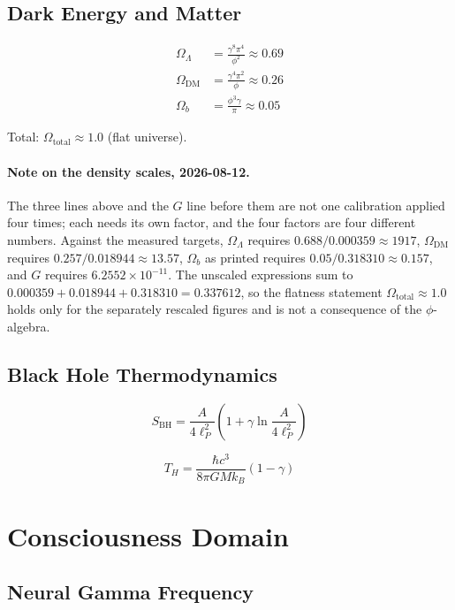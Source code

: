 \documentclass[12pt,a4paper]{article}
\begin{document}
\subsection{Dark Energy and Matter}

\begin{align}
\Omega_\Lambda &= \frac{\gamma^8 \pi^4}{\phi^2} \approx 0.69 \\
\Omega_{\text{DM}} &= \frac{\gamma^4 \pi^2}{\phi} \approx 0.26 \\
\Omega_b &= \frac{\phi^3 \gamma}{\pi} \approx 0.05
\end{align}

Total: $\Omega_{\text{total}} \approx 1.0$ (flat universe).

\paragraph{Note on the density scales, 2026-08-12.} The three lines above and the $G$ line before them are not one calibration applied four times; each needs its own factor, and the four factors are four different numbers. Against the measured targets, $\Omega_\Lambda$ requires $0.688/0.000359 \approx 1917$, $\Omega_{\mathrm{DM}}$ requires $0.257/0.018944 \approx 13.57$, $\Omega_b$ as printed requires $0.05/0.318310 \approx 0.157$, and $G$ requires $6.2552\times10^{-11}$. The unscaled expressions sum to $0.000359 + 0.018944 + 0.318310 = 0.337612$, so the flatness statement $\Omega_{\text{total}} \approx 1.0$ holds only for the separately rescaled figures and is not a consequence of the $\phi$-algebra.

\subsection{Black Hole Thermodynamics}

\begin{equation}
S_{\text{BH}} = \frac{A}{4\ell_P^2}\left(1 + \gamma \ln\frac{A}{4\ell_P^2}\right)
\end{equation}

\begin{equation}
T_H = \frac{\hbar c^3}{8\pi GM k_B}(1 - \gamma)
\end{equation}

\section{Consciousness Domain}

\subsection{Neural Gamma Frequency}
\end{document}
